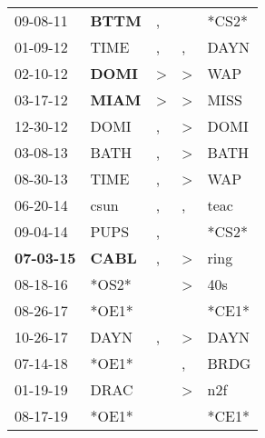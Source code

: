 \begin{supertabular}{p{0.07\textwidth}p{0.06\textwidth}p{0.02\textwidth}p{0.02\textwidth}p{0.06\textwidth}}
          09-08-11\textsuperscript{} &  \textbf{BTTM\textsuperscript{}} &             , &               &                            *CS2* \\
          01-09-12\textsuperscript{} &           TIME\textsuperscript{} &             , &             , &           DAYN\textsuperscript{} \\
          02-10-12\textsuperscript{} &  \textbf{DOMI\textsuperscript{}} &  \textgreater &  \textgreater &            WAP\textsuperscript{} \\
          03-17-12\textsuperscript{} &  \textbf{MIAM\textsuperscript{}} &  \textgreater &  \textgreater &           MISS\textsuperscript{} \\
          12-30-12\textsuperscript{} &           DOMI\textsuperscript{} &             , &  \textgreater &           DOMI\textsuperscript{} \\
          03-08-13\textsuperscript{} &           BATH\textsuperscript{} &             , &  \textgreater &           BATH\textsuperscript{} \\
          08-30-13\textsuperscript{} &           TIME\textsuperscript{} &             , &  \textgreater &            WAP\textsuperscript{} \\
          06-20-14\textsuperscript{} &           csun\textsuperscript{} &             , &             , &           teac\textsuperscript{} \\
          09-04-14\textsuperscript{} &           PUPS\textsuperscript{} &             , &               &                            *CS2* \\
 \textbf{07-03-15\textsuperscript{}} &  \textbf{CABL\textsuperscript{}} &             , &  \textgreater &           ring\textsuperscript{} \\
          08-18-16\textsuperscript{} &                            *OS2* &               &  \textgreater &            40s\textsuperscript{} \\
          08-26-17\textsuperscript{} &                            *OE1* &               &               &                            *CE1* \\
          10-26-17\textsuperscript{} &           DAYN\textsuperscript{} &             , &  \textgreater &           DAYN\textsuperscript{} \\
          07-14-18\textsuperscript{} &                            *OE1* &               &             , &           BRDG\textsuperscript{} \\
          01-19-19\textsuperscript{} &           DRAC\textsuperscript{} &               &  \textgreater &            n2f\textsuperscript{} \\
          08-17-19\textsuperscript{} &                            *OE1* &               &               &                            *CE1* \\
\end{supertabular}
